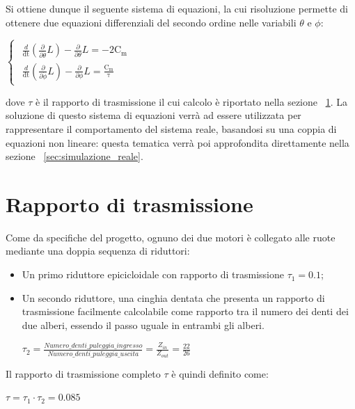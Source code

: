 \newpage
Si ottiene dunque il seguente sistema di equazioni, la cui risoluzione permette di ottenere due equazioni differenziali del secondo ordine nelle variabili $\theta$ e $\phi$:
\begin{center}
	$
	\begin{cases}
		\label{eq:lagrangiana_theta_phi}
		\begin{array}{c}
			\frac{d}{\mathrm{dt}}\left(\frac{\partial }{\partial \dot{\theta} }L\right)-\frac{\partial }{\partial \theta}L=\mathrm{-2 C_m} \\
			\frac{d}{\mathrm{dt}}\left(\frac{\partial }{\partial \dot{\phi} }L\right)-\frac{\partial }{\partial \phi}L=\mathrm{\frac{C_m}{\tau}}
		\end{array}
	\end{cases}
	$
\end{center}
dove $\tau$ è il rapporto di trasmissione il cui calcolo è riportato nella sezione ~\ref{sec:rapp_di_trasmissione}.
La soluzione di questo sistema di equazioni verrà ad essere utilizzata per rappresentare il comportamento del sistema reale, basandosi su una coppia di equazioni non lineare: questa tematica verrà poi approfondita direttamente nella sezione ~\ref{sec:simulazione_reale}.

\section{Rapporto di trasmissione}
\label{sec:rapp_di_trasmissione}
Come da specifiche del progetto, ognuno dei due motori è collegato alle ruote mediante una doppia sequenza di riduttori:
\begin{itemize}
	\item Un primo riduttore epicicloidale con rapporto di trasmissione $\tau_1 = 0.1$;
	\item Un secondo riduttore, una cinghia dentata che presenta un rapporto di trasmissione facilmente calcolabile come rapporto tra il numero dei denti dei due alberi, essendo il passo uguale in entrambi gli alberi.
	\begin{center}
		$\tau_2 = \frac{Numero\_denti\_puleggia\_ingresso}{Numero\_denti\_puleggia\_uscita} = \frac{Z_{in}}{Z_{out}} = \frac{22}{26}$
	\end{center}
\end{itemize}

Il rapporto di trasmissione completo $\tau$ è quindi definito come:
\begin{center}
	$\tau = \tau_1 \cdot{\tau_2} = 0.085$	
\end{center}


